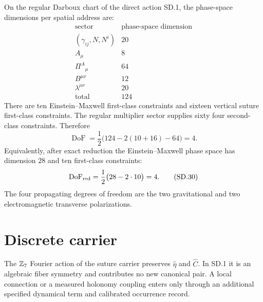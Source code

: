\documentclass[10pt]{article}
\newcommand{\hateta}{\widehat\eta}
\newcommand{\hatC}{\widehat C}
\newcommand{\DoF}{\operatorname{DoF}}
\begin{document}
On the regular Darboux chart of the direct action SD.1, the phase-space
dimensions per spatial address are:
\[
\begin{array}{c|c}
\text{sector}&\text{phase-space dimension}\\ \hline
(\gamma_{ij},N,N^i) &20\\
A_\mu &8\\
\Pi^A{}_{\mu}&64\\
B^{\mu\nu}&12\\
\lambda^{\mu\nu}&20\\ \hline
\text{total}&124
\end{array}
\tag{SD.28}
\]
There are ten Einstein--Maxwell first-class constraints and sixteen vertical
suture first-class constraints. The regular multiplier sector supplies sixty
four second-class constraints. Therefore
\[
\DoF=
\frac12\bigl(124-2(10+16)-64\bigr)=4.
\tag{SD.29}
\]
Equivalently, after exact reduction the Einstein--Maxwell phase space has
dimension $28$ and ten first-class constraints:
\[
\DoF_{\rm red}=\frac12\bigl(28-2\cdot10\bigr)=4.
\tag{SD.30}
\]
The four propagating degrees of freedom are the two gravitational and two
electromagnetic transverse polarizations.

\section{Discrete carrier}

The $\mathbb Z_7$ Fourier action of the suture carrier preserves $\hateta$ and
$\hatC$. In SD.1 it is an algebraic fiber symmetry and contributes no new
canonical pair. A local connection or a measured holonomy coupling enters
only through an additional specified dynamical term and calibrated
occurrence record.
\end{document}
